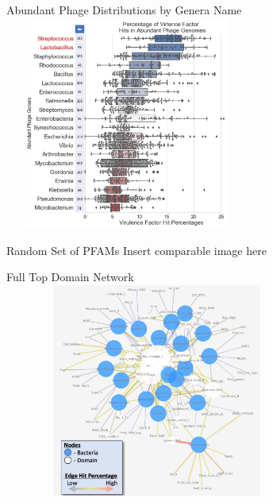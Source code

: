 \documentclass[11pt, xcolor=table]{beamer}
\begin{document}
	\begin{frame}{Abundant Phage Distributions by Genera Name}
	\centering
	\includegraphics[height=7cm, width=8cm]{CPBS_11_18/Abundances.jpg}
	
	\end{frame}
	\begin{frame}{Random Set of PFAMs}
	Insert comparable image here
	\end{frame}
	\begin{frame}{Full Top Domain Network}
	\center
	\includegraphics[height=7cm, width=10cm]{CPBS_11_18/Network.jpg}
	\end{frame}
	
\end{document}
